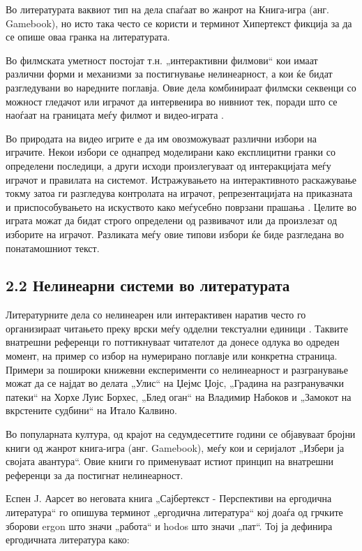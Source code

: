 Во литературата ваквиот тип на дела спаѓаат во жанрот на Книга-игра (анг. Gamebook), но исто така често се користи и терминот Хипертекст фикција за да се опише оваа гранка на литературата. \cite{ref15}

Во филмската уметност постојат т.н. „интерактивни филмови“ кои имаат различни форми и механизми за постигнување нелинеарност, а кои ќе бидат разгледувани во наредните поглавја. Овие дела комбинираат филмски секвенци со можност гледачот или играчот да интервенира во нивниот тек, поради што се наоѓаат на границата меѓу филмот и видео-играта \cite{ref7}.

Во природата на видео игрите е да им овозможуваат различни избори на играчите. Некои избори се однапред моделирани како експлицитни гранки со определени последици, а други исходи произлегуваат од интеракцијата меѓу играчот и правилата на системот. Истражувањето на интерактивното раскажување токму затоа ги разгледува контролата на играчот, репрезентацијата на приказната и приспособувањето на искуството како меѓусебно поврзани прашања \cite{ref3}. Целите во играта можат да бидат строго определени од развивачот или да произлезат од изборите на играчот. Разликата меѓу овие типови избори ќе биде разгледана во понатамошниот текст.

\subsection{2.2 Нелинеарни системи во литературата}

Литературните дела со нелинеарен или интерактивен наратив често го организираат читањето преку врски меѓу одделни текстуални единици \cite{ref15}. Таквите внатрешни референци го поттикнуваат читателот да донесе одлука во одреден момент, на пример со избор на нумерирано поглавје или конкретна страница. Примери за пошироки книжевни експерименти со нелинеарност и разгранување можат да се најдат во делата „Улис“ на Џејмс Џојс, „Градина на разгранувачки патеки“ на Хорхе Луис Борхес, „Блед оган“ на Владимир Набоков и „Замокот на вкрстените судбини“ на Итало Калвино.

Во популарната култура, од крајот на седумдесеттите години се објавуваат бројни книги од жанрот книга-игра (анг. Gamebook), меѓу кои и серијалот „Избери ја својата авантура“. Овие книги го применуваат истиот принцип на внатрешни референци за да постигнат нелинеарност.

Еспен J. Аарсет во неговата книга „Сајбертекст - Перспективи на ергодична литература“ го опишува терминот „ергодична литература“ кој доаѓа од грчките зборови ergon што значи „работа“ и hodos што значи „пат“.\cite{ref1} Тој ја дефинира ергодичната литература како:


